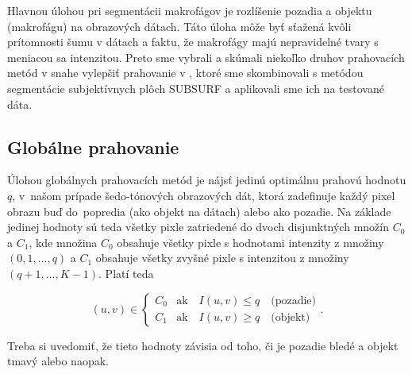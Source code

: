 \documentclass[a4paper,11pt,oneside]{article}%
\begin{document}
Hlavnou úlohou pri segmentácii makrofágov je rozlíšenie pozadia a objektu (makrofágu) na obrazových dátach. Táto úloha môže byť sťažená kvôli prítomnosti šumu v dátach a faktu, že
makrofágy majú nepravidelné tvary s meniacou sa intenzitou. Preto sme vybrali a skúmali niekoľko druhov prahovacích metód v snahe vylepšiť prahovanie  v \cite{sora}, ktoré sme skombinovali  s metódou segmentácie subjektívnych plôch SUBSURF a aplikovali sme ich na testované dáta.

\subsection{Globálne prahovanie}


 Úlohou globálnych prahovacích metód je nájsť jedinú optimálnu prahovú hodnotu $q$, v~našom prípade šedo-tónových obrazových dát, ktorá zadefinuje každý pixel obrazu buď do~popredia (ako objekt na dátach) alebo ako pozadie.  Na základe jedinej hodnoty sú teda všetky pixle zatriedené do dvoch disjunktných množín $C_0$ a $C_1$, kde množina $C_0$ obsahuje všetky pixle s hodnotami intenzity z množiny  $(0, 1, \dots , q)$ a $C_1$ obsahuje všetky zvyšné pixle s intenzitou z množiny $(q+1, \dots , K-1)$. Platí  teda

\begin{equation}
(u, v) \in \begin{cases} C_0 & \text{ak} \hspace{1em} I(u,v) \leq q \hspace{1em} \text{(pozadie)} \\  C_1 & \text{ak} \hspace{1em} I(u,v) \geq q \hspace{1em} \text{(objekt)} \end{cases}.
\end{equation}

Treba si uvedomiť, že tieto hodnoty závisia od toho, či je pozadie bledé a objekt tmavý alebo naopak.
\end{document}
